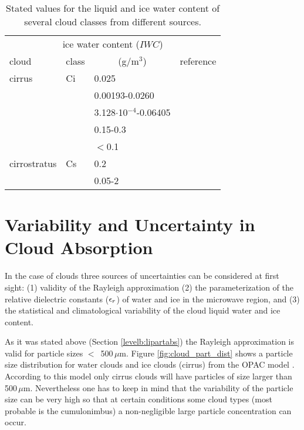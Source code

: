 \begin{table}[!htb]
\begin{center}
\begin{tabular}{llll}
\multicolumn{4}{c}{ice water content ($IWC$)}  \\
 cloud        & class & \multicolumn{1}{c}{(g/m$^3$)} & reference\\
\hline
 cirrus       & Ci    & 0.025                         & \citet{salby:96}\\
              &       & 0.00193-0.0260                & \citet{hess:98}\\
              &       & 3.128$\cdot$10$^{-4}$-0.06405 & \citet{abreu:96}\\ 
              &       & 0.15-0.3                      & \citet{larsenetal:98}\\
              &       & $<$0.1                        & \citet{berton:00}\\
cirrostratus  & Cs    & 0.2                           & \citet{salby:96}\\
              &       & 0.05-2                        & \citet{berton:00}\\
\hline
\end{tabular}
\caption{Stated values for the liquid and ice water content of several 
  cloud classes from different sources.}
\label{tab:lwc}
\end{center}
\end{table}



\section{Variability and Uncertainty in Cloud Absorption}
\label{levelb:ref_uncert_clouds}
In the case of clouds three sources of uncertainties can be considered
at first sight: (1) validity of the Rayleigh approximation (2) the 
parameterization of the relative dielectric constants ($\epsilon_r$) of water 
and ice in the microwave region, and (3) the statistical and
climatological variability of the cloud liquid water and ice content.

As it was stated above (Section \ref{levelb:lipartabs}) the Rayleigh 
approximation is valid for particle sizes $<$~500\,$\mu$m. Figure 
\ref{fig:cloud_part_dist} shows a particle size distribution for water
clouds and ice clouds (cirrus) from the OPAC model \citep{hess:98}. 
According to this model only cirrus clouds will have particles of size
larger than 500\,$\mu$m. Nevertheless one has to keep in mind that the
variability of the particle size can be very high so that at certain 
conditions some cloud types (most probable is the cumulonimbus) 
a non-negligible large particle concentration can occur.

